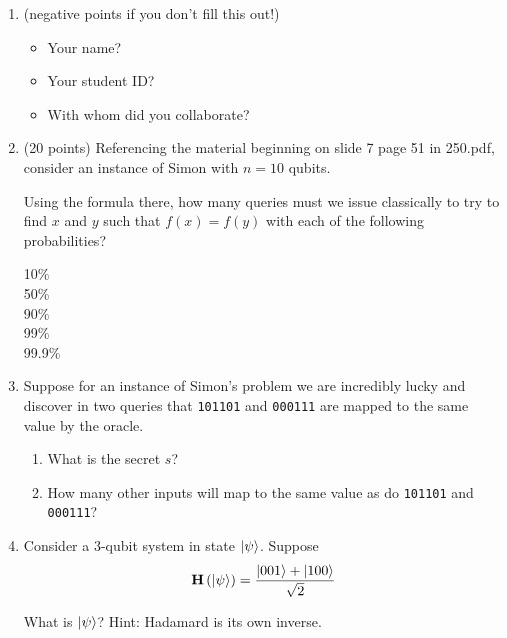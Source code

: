 \documentclass[12pt]{article}
\begin{document}


\begin{enumerate}[font=\bfseries]

\item {} (negative points if you don't fill this out!)
\begin{itemize}
    \item Your name?\Blank[20em]{}
    \item Your student ID?\Blank[12em]{}
    \item With whom did you collaborate?
    \LeaveSpace{}
\end{itemize}

\item (20 points) Referencing the material beginning on slide 7 page 51 in 250.pdf, consider an instance of Simon with $n=10$ qubits.  

Using the formula there, how many queries must we issue classically to try to find $x$ and $y$ such that $f(x)=f(y)$ with each of the following probabilities?
\begin{description}
    \item[10\%] \Blank{}
    \item[50\%] \Blank{}
    \item[90\%] \Blank{}
    \item[99\%] \Blank{}
    \item[99.9\%] \Blank{}
\end{description}
\item{} Suppose for an instance of Simon's problem we are incredibly lucky and discover in two queries that \texttt{101101} and \texttt{000111} are mapped to the same value by the oracle.  \begin{enumerate}[label=\theenumi.\arabic*]
    \item What is the secret $s$?\Blank[1.5in]{}
    \item How many other inputs will map to the same value as do \texttt{101101} and \texttt{000111}?\Blank{}
\end{enumerate}

\item {} Consider a 3-qubit system in state $\ket{\psi}$.  Suppose \[ \textbf{H}\left(\ket{\psi}\right)=\frac{\ket{001}+\ket{100}}{\sqrt{2}}\] 

What is $\ket{\psi}$? 
Hint: Hadamard is its own inverse.
\LeaveSpace{}


\end{enumerate}
\end{document}
